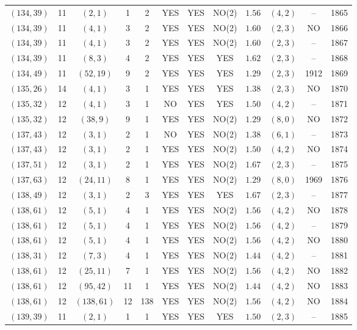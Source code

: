 \begin{longtable}{|c|c|c|c|c|c|c|c|c|c|c|c|}
$(134,39)$ & 11 & $(2,1)$ & 1 & 2 & YES & YES & NO(2) & $1.56$ & $(4,2)$ & -- & 1865\\
$(134,39)$ & 11 & $(4,1)$ & 3 & 2 & YES & YES & NO(2) & $1.60$ & $(2,3)$ & NO & 1866\\
$(134,39)$ & 11 & $(4,1)$ & 3 & 2 & YES & YES & NO(2) & $1.60$ & $(2,3)$ & -- & 1867\\
$(134,39)$ & 11 & $(8,3)$ & 4 & 2 & YES & YES & YES & $1.62$ & $(2,3)$ & -- & 1868\\
$(134,49)$ & 11 & $(52,19)$ & 9 & 2 & YES & YES & YES & $1.29$ & $(2,3)$ & 1912 & 1869\\
$(135,26)$ & 14 & $(4,1)$ & 3 & 1 & YES & YES & YES & $1.38$ & $(2,3)$ & NO & 1870\\
$(135,32)$ & 12 & $(4,1)$ & 3 & 1 & NO & YES & YES & $1.50$ & $(4,2)$ & -- & 1871\\
$(135,32)$ & 12 & $(38,9)$ & 9 & 1 & YES & YES & NO(2) & $1.29$ & $(8,0)$ & NO & 1872\\
$(137,43)$ & 12 & $(3,1)$ & 2 & 1 & NO & YES & NO(2) & $1.38$ & $(6,1)$ & -- & 1873\\
$(137,43)$ & 12 & $(3,1)$ & 2 & 1 & YES & YES & NO(2) & $1.50$ & $(4,2)$ & NO & 1874\\
$(137,51)$ & 12 & $(3,1)$ & 2 & 1 & YES & YES & NO(2) & $1.67$ & $(2,3)$ & -- & 1875\\
$(137,63)$ & 12 & $(24,11)$ & 8 & 1 & YES & YES & NO(2) & $1.29$ & $(8,0)$ & 1969 & 1876\\
$(138,49)$ & 12 & $(3,1)$ & 2 & 3 & YES & YES & YES & $1.67$ & $(2,3)$ & -- & 1877\\
$(138,61)$ & 12 & $(5,1)$ & 4 & 1 & YES & YES & NO(2) & $1.56$ & $(4,2)$ & NO & 1878\\
$(138,61)$ & 12 & $(5,1)$ & 4 & 1 & YES & YES & NO(2) & $1.56$ & $(4,2)$ & -- & 1879\\
$(138,61)$ & 12 & $(5,1)$ & 4 & 1 & YES & YES & NO(2) & $1.56$ & $(4,2)$ & NO & 1880\\
$(138,31)$ & 12 & $(7,3)$ & 4 & 1 & YES & YES & NO(2) & $1.44$ & $(4,2)$ & -- & 1881\\
$(138,61)$ & 12 & $(25,11)$ & 7 & 1 & YES & YES & NO(2) & $1.56$ & $(4,2)$ & NO & 1882\\
$(138,61)$ & 12 & $(95,42)$ & 11 & 1 & YES & YES & NO(2) & $1.44$ & $(4,2)$ & NO & 1883\\
$(138,61)$ & 12 & $(138,61)$ & 12 & 138 & YES & YES & NO(2) & $1.56$ & $(4,2)$ & NO & 1884\\
$(139,39)$ & 11 & $(2,1)$ & 1 & 1 & YES & YES & YES & $1.50$ & $(2,3)$ & -- & 1885\\

\end{longtable}
